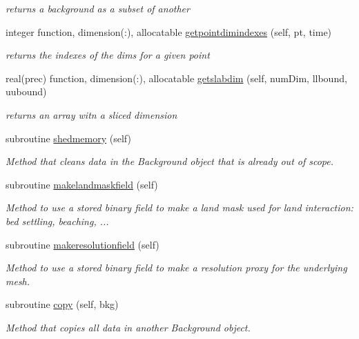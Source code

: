 \begin{DoxyCompactItemize}
\begin{DoxyCompactList}\small\item\em returns a background as a subset of another \end{DoxyCompactList}\item 
integer function, dimension(\+:), allocatable \mbox{\hyperlink{namespacebackground__mod_ac799224ce7ad219bf1fb4f1f42508f45}{getpointdimindexes}} (self, pt, time)
\begin{DoxyCompactList}\small\item\em returns the indexes of the dims for a given point \end{DoxyCompactList}\item 
real(prec) function, dimension(\+:), allocatable \mbox{\hyperlink{namespacebackground__mod_a09d61976c4545e8753eb4594044b109d}{getslabdim}} (self, num\+Dim, llbound, uubound)
\begin{DoxyCompactList}\small\item\em returns an array witn a sliced dimension \end{DoxyCompactList}\item 
subroutine \mbox{\hyperlink{namespacebackground__mod_a2c75c9011305adad2f19fc2233df700d}{shedmemory}} (self)
\begin{DoxyCompactList}\small\item\em Method that cleans data in the Background object that is already out of scope. \end{DoxyCompactList}\item 
subroutine \mbox{\hyperlink{namespacebackground__mod_a26fbde130644e684871804b73de8d51b}{makelandmaskfield}} (self)
\begin{DoxyCompactList}\small\item\em Method to use a stored binary field to make a land mask used for land interaction\+: bed settling, beaching, ... \end{DoxyCompactList}\item 
subroutine \mbox{\hyperlink{namespacebackground__mod_aac8ce1ba8edcc9b7669d427318191552}{makeresolutionfield}} (self)
\begin{DoxyCompactList}\small\item\em Method to use a stored binary field to make a resolution proxy for the underlying mesh. \end{DoxyCompactList}\item 
subroutine \mbox{\hyperlink{namespacebackground__mod_ac6241a19bbe0f4b2482f95ed3d84056d}{copy}} (self, bkg)
\begin{DoxyCompactList}\small\item\em Method that copies all data in another Background object. \end{DoxyCompactList}\item 

\end{DoxyCompactItemize}
